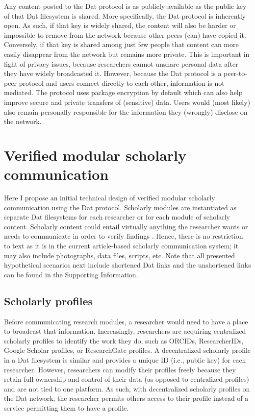 \documentclass[publications,article,submit,moreauthors,pdftex,10pt,a4paper]{Definitions/mdpi}
\begin{document}
Any content posted to the Dat protocol is as publicly available as the
public key of that Dat filesystem is shared. More specifically, the
Dat protocol is inherently open. As such, if that key is widely
shared, the content will also be harder or impossible to remove from
the network because other peers (can) have copied it. Conversely, if
that key is shared among just few people that content can more easily
disappear from the network but remains more private. This is important
in light of privacy issues, because researchers cannot unshare
personal data after they have widely broadcasted it. However, because
the Dat protocol is a peer-to-peer protocol and users connect directly
to each other, information is not mediated. The protocol uses package
encryption by default which can also help improve secure and private
transfers of (sensitive) data. Users would (most likely) also remain
personally responsible for the information they (wrongly) disclose on
the network.

\section*{Verified modular scholarly
communication}\label{verified-modular-scholarly-communication}

Here I propose an initial technical design of verified modular
scholarly communication using the Dat protocol. Scholarly modules are
instantiated as separate Dat filesystems for each researcher or for
each module of scholarly content. Scholarly content could entail
virtually anything the researcher wants or needs to communicate in
order to verify findings \citep[see also
][]{doi:10.3390/publications6020021}. Hence, there is no restriction
to text as it is in the current article-based scholarly communication
system; it may also include photographs, data files, scripts,
etc. Note that all presented hypothetical scenarios next include
shortened Dat links and the unshortened links can be found in the
Supporting Information.

\subsection*{Scholarly profiles}\label{scholarly-profiles}

Before communicating research modules, a researcher would need to have a
place to broadcast that information. Increasingly, researchers are
acquiring centralized scholarly profiles to identify the work they do,
such as ORCIDs, ResearcherIDs, Google Scholar profiles, or ResearchGate
profiles. A decentralized scholarly profile in a Dat filesystem is
similar and provides a unique ID (i.e., public key) for each researcher.
However, researchers can modify their profiles freely because they
retain full ownership and control of their data (as opposed to
centralized profiles) and are not tied to one platform. As such, with
decentralized scholarly profiles on the Dat network, the researcher
permits others access to their profile instead of a service permitting
them to have a profile.
\end{document}
